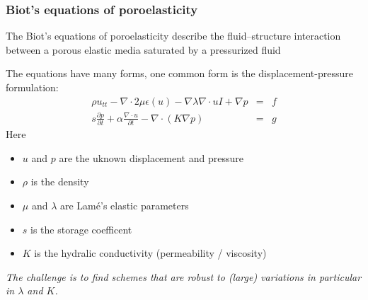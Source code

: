 \begin{frame}
\frametitle{Biot's equations of poroelasticity} 
The Biot's equations of poroelasticity describe the fluid--structure interaction
between a porous elastic media saturated  
by a pressurized fluid 

\vspace{0.3cm}
The equations have many forms, one common form is the displacement-pressure formulation: 
\begin{eqnarray*}
\rho u_{tt} - \nabla\cdot 2 \mu \epsilon(u) - \nabla \lambda \nabla \cdot u I + \nabla p &=& f \\   
s \frac{\partial p}{\partial t} + \alpha \frac{\nabla \cdot u}{\partial t} - \nabla \cdot (K \nabla p) &=& g 
\end{eqnarray*}
Here 
\begin{itemize}
\item $u$ and $p$ are the uknown displacement and pressure
\item $\rho$ is the density 
\item $\mu$ and $\lambda$ are  Lam\'{e}'s elastic parameters
\item $s$ is the storage coefficent
\item $K$ is the hydralic conductivity (permeability / viscosity) 
\end{itemize}
\emph{The challenge is to find schemes that are robust to (large) variations
in particular in $\lambda$ and $K$.} 
\end{frame}
